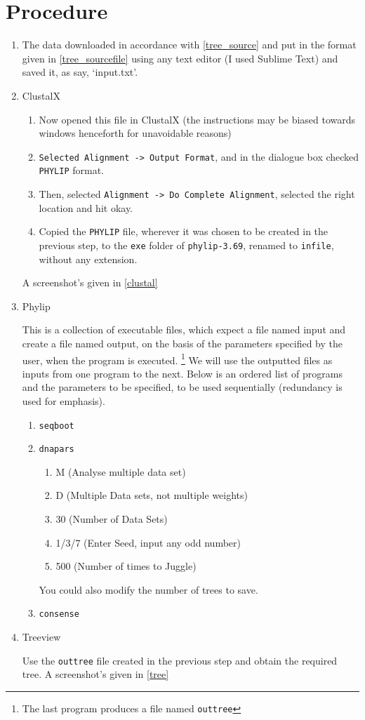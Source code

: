 \section{Procedure}
	\begin{enumerate}
		\item The data downloaded in accordance with \autoref{tree_source} and put in the format given in \autoref{tree_sourcefile} using any text editor (I used Sublime Text) and saved it, as say, `input.txt'. 
		\item ClustalX 
		\begin{enumerate}
			\item Now opened this file in ClustalX (the instructions may be biased towards windows henceforth for unavoidable reasons)
			\item \texttt{Selected Alignment -> Output Format}, and in the dialogue box checked \texttt{PHYLIP} format.
			\item Then, selected \texttt{Alignment -> Do Complete Alignment}, selected the right location and hit okay.
			\item Copied the \texttt{PHYLIP} file, wherever it was chosen to be created in the previous step, to the \texttt{exe} folder of \texttt{phylip-3.69}, renamed to \texttt{infile}, without any extension.
		\end{enumerate}
		A screenshot's given in \autoref{clustal}

		\item Phylip 
		\par
		This is a collection of executable files, which expect a file named input and create a file named output, on the basis of the parameters specified by the user, when the program is executed. \footnote{The last program produces a file named \texttt{outtree}} We will use the outputted files as inputs from one program to the next. Below is an ordered list of programs and the parameters to be specified, to be used sequentially (redundancy is used for emphasis). 
		\begin{enumerate}
			\item \texttt{seqboot}
			\item \texttt{dnapars}
			\begin{enumerate}
				\item M (Analyse multiple data set)
				\item D (Multiple Data sets, not multiple weights)
				\item 30 (Number of Data Sets)
				\item 1/3/7 (Enter Seed, input any odd number)
				\item 500	(Number of times to Juggle)
			\end{enumerate}
			You could also modify the number of trees to save.
			\item \texttt{consense}			
		\end{enumerate}
		\item Treeview
		\par
		Use the \texttt{outtree} file created in the previous step and obtain the required tree.
		A screenshot's given in \autoref{tree}
	\end{enumerate}


